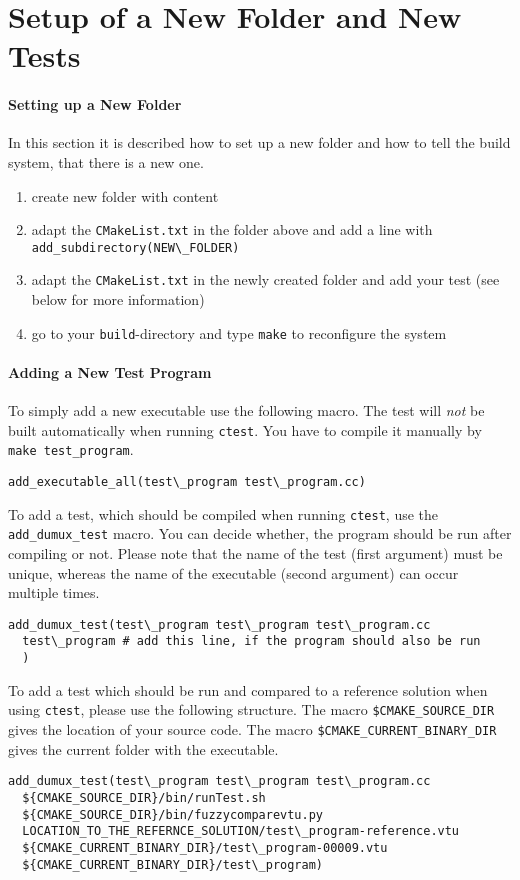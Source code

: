 \section{Setup of a New Folder and New Tests}

\paragraph{Setting up a New Folder}
In this section it is described how to set up a new folder and how to tell
the build system, that there is a new one.

\begin{enumerate}[1)]
 \item create new folder with content
 \item adapt the \verb+CMakeList.txt+ in the folder above and add a line with
       \verb+add_subdirectory(NEW\_FOLDER)+
 \item adapt the \verb+CMakeList.txt+ in the newly created folder and add your test
       (see below for more information)
 \item go to your \texttt{build}-directory and type \verb+make+ to
       reconfigure the system
\end{enumerate}

\paragraph{Adding a New Test Program}
\noindent To simply add a new executable use the following macro. The test will \emph{not} be built
automatically when running \texttt{ctest}. You have to compile it manually by
\texttt{make test\_program}.
\begin{verbatim}
add_executable_all(test\_program test\_program.cc)
\end{verbatim}

\noindent To add a test, which should be compiled when running \texttt{ctest}, use the
\texttt{add\_dumux\_test} macro. You can decide whether, the program should be run
after compiling or not.
Please note that the name of the test (first argument) must be unique, whereas the name
of the executable (second argument) can occur multiple times.
\begin{verbatim}
add_dumux_test(test\_program test\_program test\_program.cc
  test\_program # add this line, if the program should also be run
  )
\end{verbatim}

\noindent To add a test which should be run and compared to a reference solution when using
\texttt{ctest}, please use the following structure. The macro \texttt{\${CMAKE\_SOURCE\_DIR}}
gives the location of your source code. The macro \texttt{\${CMAKE\_CURRENT\_BINARY\_DIR}}
gives the current folder with the executable.
\begin{verbatim}
add_dumux_test(test\_program test\_program test\_program.cc
  ${CMAKE_SOURCE_DIR}/bin/runTest.sh
  ${CMAKE_SOURCE_DIR}/bin/fuzzycomparevtu.py
  LOCATION_TO_THE_REFERNCE_SOLUTION/test\_program-reference.vtu
  ${CMAKE_CURRENT_BINARY_DIR}/test\_program-00009.vtu
  ${CMAKE_CURRENT_BINARY_DIR}/test\_program)
\end{verbatim}

